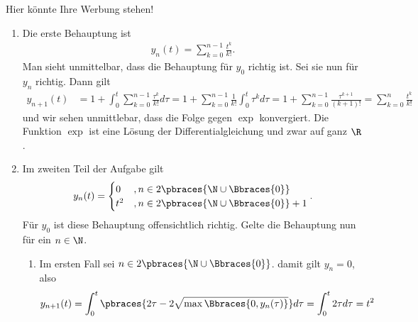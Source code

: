 \begin{solution}
    Hier könnte Ihre Werbung stehen!
    \begin{enumerate}[label = \alph*)]
        \item Die erste Behauptung ist
        \begin{align*}
        y_n(t) = \sum_{k = 0}^{n-1} \frac{t^k}{k!} .
        \end{align*}
        Man sieht unmittelbar, dass die Behauptung für $y_0$ richtig ist. Sei sie nun für $y_n$ richtig.
        Dann gilt
        \begin{align*}
            y_{n+1}(t) &= 1 + \int_0^t \sum_{k = 0}^{n-1} \frac{\tau^k}{k!} d\tau = 1 +  \sum_{k = 0}^{n-1}\frac{1}{k!} \int_0^t \tau^k d\tau = 1 + \sum_{k = 0}^{n-1} \frac{\tau^{k + 1}}{(k+1)!} = \sum_{k = 0}^n \frac{t^k}{k!}
        \end{align*}
        und wir sehen unmittlebar, dass die Folge gegen $\exp$ konvergiert. Die Funktion $\exp$ ist eine Lösung der Differentialgleichung und zwar auf ganz $\R$.

        \item Im zweiten Teil der Aufgabe gilt
        \begin{align*}
            y_n(t) = 
            \begin{cases}
                0 &, n \in 2 \pbraces{\N \cup \Bbraces{0}} \\
                t^2 &, n \in 2 \pbraces{\N \cup \Bbraces{0}} + 1
            \end{cases} .
        \end{align*}
        Für $y_0$ ist diese Behauptung offensichtlich richtig. Gelte die Behauptung nun für ein $n \in \N$.
        \begin{enumerate}[label = \roman*)]
            \item Im ersten Fall sei $n \in 2 \pbraces{\N \cup \Bbraces{0}}$. damit gilt $y_n = 0$, also 
            \begin{align*}
                y_{n+1}(t) = \int_0^t \pbraces{2\tau - 2 \sqrt{\max\Bbraces{0, y_n(\tau)}}} d\tau = \int_0^t 2\tau d\tau = t^2
            \end{align*}


\end{enumerate}
\end{enumerate}
\end{solution}
